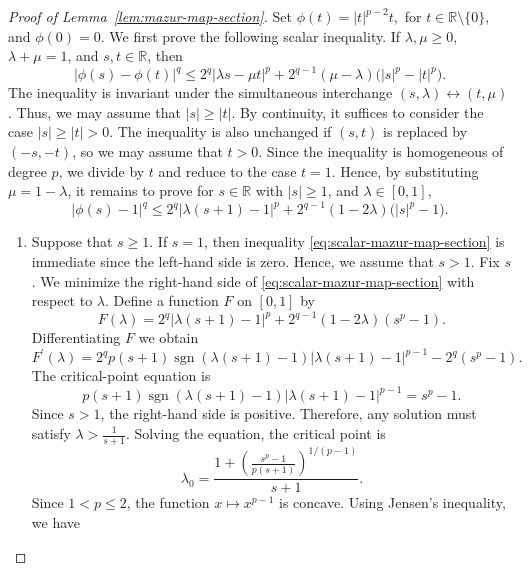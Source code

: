 \documentclass[11pt,a4paper]{amsart}
\theoremstyle{plain}
\theoremstyle{definition}
\newcommand{\R}{\mathbb R}
\begin{document}
\begin{proof}[Proof of Lemma~\ref{lem:mazur-map-section}] 
Set $\phi(t)=|t|^{p-2}t,$ for $ t\in\R\setminus\{0\},$ and $\phi(0)=0.$ We first prove the following scalar inequality. If
$\lambda,\mu\geq0$, $\lambda+\mu=1$, and $s,t\in\R$, then
\begin{equation}
\label{eq:scalar-mazur-map-section-claim}
    |\phi(s)-\phi(t)|^q
    \leq
    2^q|\lambda s-\mu t|^p
    +
    2^{q-1}(\mu-\lambda)
    \bigl(|s|^p-|t|^p\bigr).
\end{equation}
The inequality is invariant under the simultaneous interchange $(s,\lambda)\leftrightarrow(t,\mu)$. Thus, we may assume that $|s| \geq |t|$. By continuity, it suffices to consider the case $
|s|\geq |t|>0$. The inequality is also unchanged if $(s,t)$ is replaced by $(-s,-t)$, so we may assume that $t > 0$. Since the inequality is homogeneous of degree $p$, we divide by $t$ and reduce to the case $t=1$. Hence, by substituting $\mu = 1-\lambda$, it remains to prove for $s \in \R$ with $|s| \geq 1$, and $\lambda \in [0,1]$,
\begin{equation}
\label{eq:scalar-mazur-map-section}
    |\phi(s)-1|^q
    \leq
    2^q|\lambda (s+1)-1 |^p
    +
    2^{q-1}(1-2\lambda)
    \bigl(|s|^p-1\bigr).
\end{equation}
\begin{enumerate}[wide =0pt, labelwidth= 1.1cm]
    \item[\bf Case 1:] Suppose that $s \geq 1$. If $s = 1$, then inequality \eqref{eq:scalar-mazur-map-section} is immediate since the left-hand side is zero. Hence, we assume that $s > 1$. Fix $s$. We minimize the right-hand side of \eqref{eq:scalar-mazur-map-section} with respect to $\lambda$. Define a function $F$ on $[0,1]$ by 
    \[
        F(\lambda) = 2^q|\lambda(s+1)-1|^p+2^{q-1}(1-2 \lambda)\left(s^p-1\right).
    \]
    Differentiating $F$ we obtain 
    \[
        F^{\prime}(\lambda)=2^q p(s+1) \operatorname{sgn}(\lambda(s+1)-1)|\lambda(s+1)-1|^{p-1}-2^q\left(s^p-1\right).
    \]
    The critical-point equation is 
    $$
        p(s+1)\operatorname{sgn}(\lambda(s+1)-1)|\lambda(s+1)-1|^{p-1}=s^p-1 .
    $$
    Since $ s > 1$, the right-hand side is positive. Therefore,  any solution must satisfy $\lambda > \frac{1}{s+1}$. Solving the equation, the critical point is
    \[
        \lambda_0 =\frac{1+\left(\frac{s^p-1}{p(s+1)}\right)^{1 /(p-1)}}{s+1}.
    \]
    Since $1< p \leq 2$, the function $x \mapsto x^{p-1}$ is concave. Using Jensen's inequality, we have 
    \begin{equation}

\end{equation}
\end{enumerate}
\end{proof}
\end{document}
